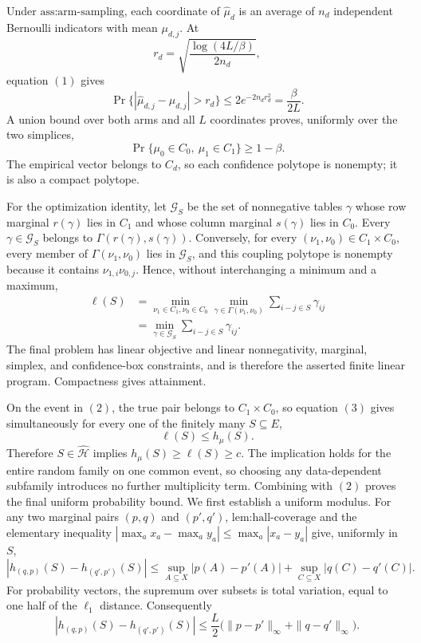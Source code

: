 Under \(\text{ass:arm-sampling}\), each coordinate of \(\widehat\mu_d\) is an average of \(n_d\) independent Bernoulli indicators with mean \(\mu_{d,j}\).  At
\[
r_d=\sqrt{\frac{\log(4L/\beta)}{2n_d}},
\]
equation \((1)\) gives
\[
\Pr\{|\widehat\mu_{d,j}-\mu_{d,j}|>r_d\}
\leq2e^{-2n_dr_d^2}=\frac{\beta}{2L}.
\]
A union bound over both arms and all \(L\) coordinates proves, uniformly over the two simplices,
\[
\Pr\{\mu_0\in C_0,\ \mu_1\in C_1\}\geq1-\beta. \tag{2}
\]
The empirical vector belongs to \(C_d\), so each confidence polytope is nonempty; it is also a compact polytope.

For the optimization identity, let \(\mathcal G_S\) be the set of nonnegative tables \(\gamma\) whose row marginal \(r(\gamma)\) lies in \(C_1\) and whose column marginal \(s(\gamma)\) lies in \(C_0\).  Every \(\gamma\in\mathcal G_S\) belongs to \(\Gamma(r(\gamma),s(\gamma))\).  Conversely, for every \((\nu_1,\nu_0)\in C_1\times C_0\), every member of \(\Gamma(\nu_1,\nu_0)\) lies in \(\mathcal G_S\), and this coupling polytope is nonempty because it contains \(\nu_{1,i}\nu_{0,j}\).  Hence, without interchanging a minimum and a maximum,
\[
\begin{aligned}
\ell(S)
&=\min_{\nu_1\in C_1,\nu_0\in C_0}
\min_{\gamma\in\Gamma(\nu_1,\nu_0)}
\sum_{i-j\in S}\gamma_{ij}\\
&=\min_{\gamma\in\mathcal G_S}\sum_{i-j\in S}\gamma_{ij}.
\end{aligned} \tag{3}
\]
The final problem has linear objective and linear nonnegativity, marginal, simplex, and confidence-box constraints, and is therefore the asserted finite linear program.  Compactness gives attainment.

On the event in \((2)\), the true pair belongs to \(C_1\times C_0\), so equation \((3)\) gives simultaneously for every one of the finitely many \(S\subseteq E\),
\[
\ell(S)\leq h_{\mu}(S).
\]
Therefore \(S\in\widehat{\mathcal H}\) implies \(h_{\mu}(S)\geq\ell(S)\geq c\).  The implication holds for the entire random family on one common event, so choosing any data-dependent subfamily introduces no further multiplicity term.  Combining with \((2)\) proves the final uniform probability bound.
We first establish a uniform modulus.  For any two marginal pairs \((p,q)\) and \((p',q')\), \(\text{lem:hall-coverage}\) and the elementary inequality \(|\max_a x_a-\max_a y_a|\leq\max_a|x_a-y_a|\) give, uniformly in \(S\),
\[
|h_{(q,p)}(S)-h_{(q',p')}(S)|
\leq \sup_{A\subseteq X}|p(A)-p'(A)|
+\sup_{C\subseteq X}|q(C)-q'(C)|.
\]
For probability vectors, the supremum over subsets is total variation, equal to one half of the \(\ell_1\) distance.  Consequently
\[
|h_{(q,p)}(S)-h_{(q',p')}(S)|
\leq\frac L2\bigl(\|p-p'\|_\infty+\|q-q'\|_\infty\bigr). \tag{1}
\]

